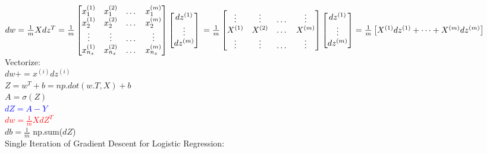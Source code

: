 \documentclass{article}
\begin{document}
$dw = \frac{1}{m} X dz^{T} = \frac{1}{m} \begin{bmatrix}
x_1^{(1)} & x_1^{(2)} & \dots & x_1^{(m)}\\
x_2^{(1)} & x_2^{(2)} & \dots & x_2^{(m)}\\
\vdots & \vdots & \dots & \vdots \\
x_{n_x}^{(1)} & x_{n_x}^{(2)} & \dots & x_{n_x}^{(m)}\\
\end{bmatrix}
\begin{bmatrix}
dz^{(1)} \\
\vdots \\
dz^{(m)} \\
\end{bmatrix}\\
= \frac{1}{m} \begin{bmatrix}
\vdots & \vdots & \dots & \vdots \\
X^{(1)} & X^{(2)} & \dots & X^{(m)}\\
\vdots & \vdots & \dots & \vdots \\
\end{bmatrix}
\begin{bmatrix}
dz^{(1)} \\
\vdots \\
dz^{(m)} \\
\end{bmatrix}
= \frac{1}{m} \begin{bmatrix}
X^{(1)}dz^{(1)} + \dots + X^{(m)}dz^{(m)}\\
\end{bmatrix}
$\\


Vectorize:\\

$dw += x^{(i)}dz^{(i)}$\\

$Z = w^T + b = np.dot(w.T,X) + b$\\

$A = \sigma(Z)$\\

\textcolor{blue}{$dZ = A-Y$}\\

\textcolor{red}{$dw = \frac{1}{m} X dZ^T$}\\

$db = \frac{1}{m}$ np.sum($dZ$)\\

Single Iteration of Gradient Descent for Logistic Regression: \\
\end{document}
